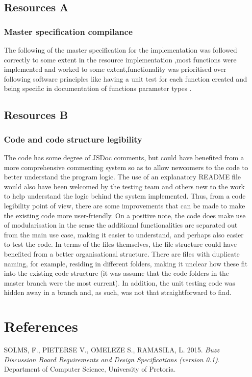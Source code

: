 \documentclass[a4paper]{article}
\begin{document}
\subsection {Resources A}
\subsubsection {Master specification compilance}
The following of the master specification for the implementation was followed correctly to some extent in the resource implementation ,most functions were implemented and worked to some extent,functionality was prioritised over following software principles like having a unit test for each function created and being specific in documentation of functions parameter types .

\subsection {Resources B}
\subsubsection {Code and code structure legibility}
The code has some degree of JSDoc comments, but could have benefited from a more comprehensive commenting system so as to allow newcomers to the code to better understand the program logic. The use of an explanatory README file would also have been welcomed by the testing team and others new to the work to help understand the logic behind the system implemented. Thus, from a code legibility point of view, there are some improvements that can be made to make the existing code more user-friendly. On a positive note, the code does make use of modularisation in the sense the additional functionalities are separated out from the main use case, making it easier to understand, and perhaps also easier to test the code.
In terms of the files themselves, the file structure could have benefited from a better organisational structure. There are files with duplicate naming, for example, residing in different folders, making it unclear how these fit into the existing code structure (it was assume that the code folders in the master branch were the most current).  In addition, the unit testing code was hidden away in a branch and, as such, was not that straightforward to find.


\section {References}
SOLMS, F., PIETERSE V., OMELEZE S., RAMASILA, L. 2015. \textit{Buzz Discussion Board Requirements and Design Specifications (version 0.1)}. Department of Computer Science, University of Pretoria.
\end{document}
